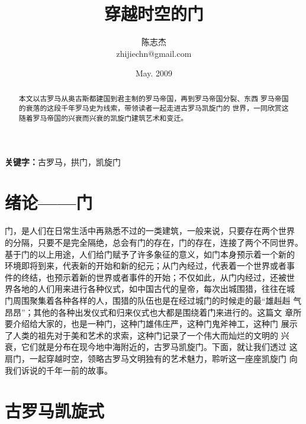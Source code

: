 \documentclass[a4paper,dvipdfm]{article}
\newcommand{\wuhao}{\fontsize{10.5pt}{1.3\baselineskip}\selectfont}
\begin{document}

\wuhao

\title{穿越时空的门}
\author{陈志杰 \\ zhijiechn@gmail.com}
\date{May. 2009}

\maketitle

\begin{abstract}
  本文以古罗马从奥古斯都建国到君主制的罗马帝国，再到罗马帝国分裂、东西
  罗马帝国的衰落的这段千年罗马史为线索，带领读者一起走进古罗马凯旋门的
  世界，一同欣赏这随着罗马帝国的兴衰而兴衰的凯旋门建筑艺术和变迁。
\end{abstract}
\textbf{关键字：}古罗马，拱门，凯旋门

\tableofcontents

\clearpage

\listoffigures

\clearpage

\section{绪论——门}

门，是人们在日常生活中再熟悉不过的一类建筑，一般来说，只要存在两个世界
的分隔，只要不是完全隔绝，总会有门的存在，门的存在，连接了两个不同世界。
基于门的以上用途，人们给门赋予了许多象征的意义，如门本身预示着一个新的
环境即将到来，代表新的开始和新的纪元；从门內经过，代表着一个世界或者事
件的终结，也预示着新的世界或者事件的开始；不仅如此，从门内经过，还被世
界各地的人们用来进行各种仪式，如中国古代的皇帝，每次出城围猎，往往在城
门周围聚集着各种各样的人，围猎的队伍也是在经过城门的时候走的最``雄赳赳
气昂昂''；其他的各种出发仪式和归来仪式也大都是围绕着门来进行的。这篇文
章所要介绍给大家的，也是一种门，这种门雄伟庄严，这种门鬼斧神工，这种门
展示了人类的祖先对于美和艺术的求索，这种门记录了一个伟大而灿烂的文明的
兴衰，它们就是分布在现今地中海附近的，古罗马凯旋门。下面，就让我们透过
这扇门，一起穿越时空，领略古罗马文明独有的艺术魅力，聆听这一座座凯旋门
向我们诉说的千年一前的故事。

\section{古罗马凯旋式}
\end{document}
